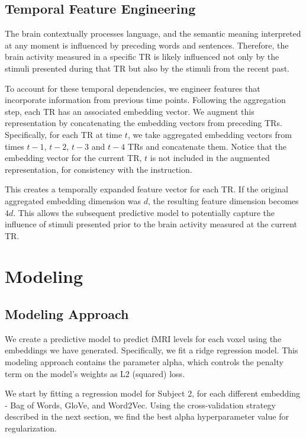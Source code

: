 \documentclass[10pt,letterpaper]{article}
\begin{document}
\subsection{Temporal Feature Engineering}

The brain contextually processes language, and the semantic meaning interpreted at any moment is influenced by preceding words and sentences. Therefore, the brain activity measured in a specific TR is likely influenced not only by the stimuli presented during that TR but also by the stimuli from the recent past.

To account for these temporal dependencies, we engineer features that incorporate information from previous time points. Following the aggregation step, each TR has an associated embedding vector. We augment this representation by concatenating the embedding vectors from preceding TRs. Specifically, for each TR at time \(t\), we take aggregated embedding vectors from times \(t-1\), \(t-2\), \(t-3\) and \(t-4\) TRs and concatenate them. Notice that the embedding vector for the current TR, \(t\) is not included in the augmented representation, for consistency with the instruction.

This creates a temporally expanded feature vector for each TR. If the original aggregated embedding dimension was \(d\), the resulting feature dimension becomes \(4d\). This allows the subsequent predictive model to potentially capture the influence of stimuli presented prior to the brain activity measured at the current TR.

\section{Modeling}

\subsection{Modeling Approach}
We create a predictive model to predict fMRI levels for each voxel using the embeddings we have generated. Specifically, we fit a ridge regression model. This modeling approach contains the parameter alpha, which controls the penalty term on the model's weights as L2 (squared) loss.

We start by fitting a regression model for Subject 2, for each different embedding - Bag of Words, GloVe, and Word2Vec. Using the cross-validation strategy described in the next section, we find the best alpha hyperparameter value for regularization.
\end{document}
